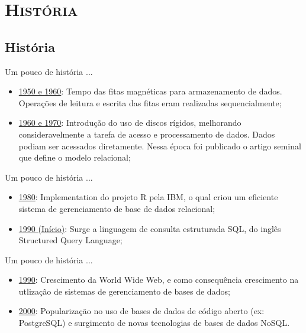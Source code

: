 \documentclass[xcolor=x11names,compress]{beamer}
\begin{document}
\section{\scshape História}
\subsection{História}

\begin{frame}{Um pouco de história ...}

\begin{itemize}
\itemsep 5mm
\item \underline{1950 e 1960}: Tempo das fitas magnéticas para armazenamento de dados. Operações de leitura e escrita das fitas eram realizadas sequencialmente;

\item \underline{1960 e 1970}: Introdução do uso de discos rígidos, melhorando consideravelmente a tarefa de acesso e processamento de dados. Dados podiam ser acessados diretamente. Nessa época foi publicado o artigo seminal que define o modelo relacional;

\end{itemize}

\end{frame}

\begin{frame}{Um pouco de história ...}

\begin{itemize}
\itemsep 5mm

\item \underline{1980}: Implementation do projeto R pela IBM, o qual criou um eficiente sistema de gerenciamento de base de dados relacional;

\item \underline{1990 (Início)}: Surge a linguagem de consulta estruturada SQL, do inglês Structured Query Language;

\end{itemize}

\end{frame}

\begin{frame}{Um pouco de história ...}

\begin{itemize}
\itemsep 5mm

\item \underline{1990}: Crescimento da World Wide Web, e como consequência crescimento na utlização de sistemas de gerenciamento de bases de dados;

\item \underline{2000}: Popularização no uso de bases de dados de código aberto (ex: PostgreSQL) e surgimento de novas tecnologias de bases de dados NoSQL. 

\end{itemize}

\end{frame}
\end{document}
